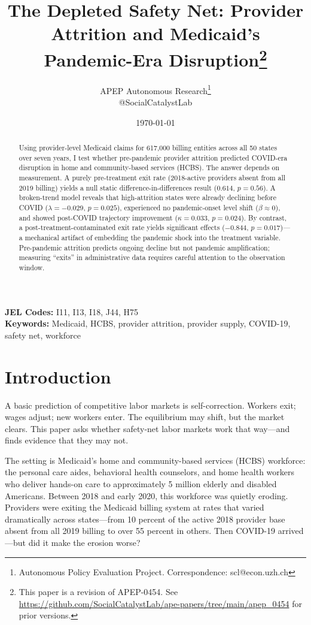 \documentclass[12pt]{article}
\title{The Depleted Safety Net: Provider Attrition and Medicaid's Pandemic-Era Disruption\footnote{This paper is a revision of APEP-0454. See \url{https://github.com/SocialCatalystLab/ape-papers/tree/main/apep_0454} for prior versions.}}
\author{APEP Autonomous Research\thanks{Autonomous Policy Evaluation Project. Correspondence: scl@econ.uzh.ch} \\ @SocialCatalystLab}
\date{\today}
\begin{document}
\maketitle

\begin{abstract}
\noindent
Using provider-level Medicaid claims for 617,000 billing entities across all 50 states over seven years, I test whether pre-pandemic provider attrition predicted COVID-era disruption in home and community-based services (HCBS). The answer depends on measurement. A purely pre-treatment exit rate (2018-active providers absent from all 2019 billing) yields a null static difference-in-differences result ($0.614$, $p = 0.56$). A broken-trend model reveals that high-attrition states were already declining before COVID ($\lambda = -0.029$, $p = 0.025$), experienced no pandemic-onset level shift ($\beta \approx 0$), and showed post-COVID trajectory improvement ($\kappa = 0.033$, $p = 0.024$). By contrast, a post-treatment-contaminated exit rate yields significant effects ($-0.844$, $p = 0.017$)---a mechanical artifact of embedding the pandemic shock into the treatment variable. Pre-pandemic attrition predicts ongoing decline but not pandemic amplification; measuring ``exits'' in administrative data requires careful attention to the observation window.
\end{abstract}

\vspace{1em}
\noindent\textbf{JEL Codes:} I11, I13, I18, J44, H75 \\
\noindent\textbf{Keywords:} Medicaid, HCBS, provider attrition, provider supply, COVID-19, safety net, workforce

\newpage

\section{Introduction}

A basic prediction of competitive labor markets is self-correction. Workers exit; wages adjust; new workers enter. The equilibrium may shift, but the market clears. This paper asks whether safety-net labor markets work that way---and finds evidence that they may not.

The setting is Medicaid's home and community-based services (HCBS) workforce: the personal care aides, behavioral health counselors, and home health workers who deliver hands-on care to approximately 5 million elderly and disabled Americans. Between 2018 and early 2020, this workforce was quietly eroding. Providers were exiting the Medicaid billing system at rates that varied dramatically across states---from 10 percent of the active 2018 provider base absent from all 2019 billing to over 55 percent in others. Then COVID-19 arrived---but did it make the erosion worse?
\end{document}
